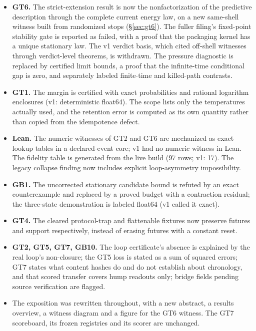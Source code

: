 \begin{itemize}
  \item \textbf{GT6.} The strict-extension result is now the nonfactorization of the predictive
    description through the complete current energy law, on a new same-shell witness built from
    randomized stops (\S\ref{sec:gt6}). The fuller filing's fixed-point stability gate is
    reported as failed, with a proof that the packaging kernel has a unique stationary law. The
    v1 verdict basis, which cited off-shell witnesses through verdict-level theorems, is
    withdrawn. The pressure diagnostic is replaced by certified limit bounds, a proof that the
    infinite-time conditional gap is zero, and separately labeled finite-time and killed-path
    contrasts.
  \item \textbf{GT1.} The margin is certified with exact probabilities and rational logarithm
    enclosures (v1: deterministic float64). The scope lists only the temperatures actually used,
    and the retention error is computed as its own quantity rather than copied from the
    idempotence defect.
  \item \textbf{Lean.} The numeric witnesses of GT2 and GT6 are mechanized as exact lookup tables
    in a declared-event core; v1 had no numeric witness in Lean. The fidelity table is generated
    from the live build (97 rows; v1: 17). The legacy collapse finding now includes explicit
    loop-asymmetry impossibility.
  \item \textbf{GB1.} The uncorrected stationary candidate bound is refuted by an exact
    counterexample and replaced by a proved budget with a contraction residual; the three-state
    demonstration is labeled float64 (v1 called it exact).
  \item \textbf{GT4.} The cleared protocol-trap and flattenable fixtures now preserve futures and
    support respectively, instead of erasing futures with a constant reset.
  \item \textbf{GT2, GT5, GT7, GB10.} The loop certificate's absence is explained by the real
    loop's non-closure; the GT5 loss is stated as a sum of squared errors; GT7 states what content
    hashes do and do not establish about chronology, and that scored transfer covers hump readouts
    only; bridge fields pending source verification are flagged.
  \item The exposition was rewritten throughout, with a new abstract, a results overview, a
    witness diagram and a figure for the GT6 witness. The GT7 scoreboard, its frozen registries
    and its scorer are unchanged.
\end{itemize}
